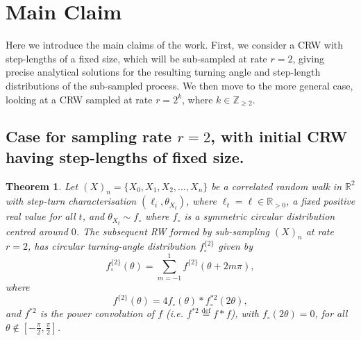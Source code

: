 \documentclass[english]{article}
\newtheorem{theorem}{Theorem}
\begin{document}
\section{Main Claim}
Here we introduce the main claims of the work.  First, we consider a CRW with step-lengths of a fixed size, which will be sub-sampled at rate $r=2$, giving precise analytical solutions for the resulting turning angle and step-length distributions of the sub-sampled process.  We then move to the more general case, looking at a CRW sampled at rate $r=2^{k}$, where $k\in\mathbb{Z}_{\geq2}$.

\subsection{Case for sampling rate $r=2$, with initial CRW having step-lengths of fixed size.}

\begin{theorem}
Let $(X)_n=\{X_0, X_1, X_2,\ldots,X_n\}$ be a correlated random walk in $\mathbb{R}^2$ with step-turn characterisation $(\ell_i,\theta_{X_t})$, where $\ell_{t}=\ell\in\mathbb{R}_{>0}$, a fixed positive real value for all $t$, and $\theta_{X_t}\sim f_{\circ}$ where $f_{\circ}$ is a symmetric circular distribution centred around $0$.  The subsequent RW formed by sub-sampling $(X)_n$ at rate $r=2$, has circular turning-angle distribution $f^{\{2\}}_{\circ}$ given by
\begin{equation}\nonumber
    f^{\{2\}}_{\circ}(\theta)=\sum_{m=-1}^{1}f^{\{2\}}(\theta+2m\pi),
\end{equation}
where 
\begin{equation}\label{eq:theorem 1}
    f^{\{2\}}(\theta)=4f_{\circ}(\theta)\ast f^{*2}_{\circ}(2\theta),
\end{equation} and $f^{*2}$ is the power convolution of $f$ (i.e. $f^{*2}\stackrel{\text{def}}{=}f\ast f$), with $f_\circ(2\theta)=0$, for all $\theta\notin[-\frac{\pi}{2},\frac{\pi}{2}]$.
\end{theorem}
\end{document}
